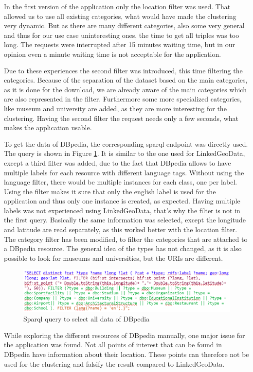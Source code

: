 In the first version of the application only the location filter was used. That allowed us to use all existing categories, what would have made the clustering very dynamic. But as there are many different categories, also some very general and thus for our use case uninteresting ones, the time to get all triples was too long. The requests were interrupted after 15 minutes waiting time, but in our opinion even a minute waiting time is not acceptable for the application. 

Due to these experiences the second filter was introduced, this time filtering the categories. Because of the separation of the dataset based on the main categories, as it is done for the download, we are already aware of the main categories which are also represented in the filter. Furthermore some more specialized categories, like museum and university are added, as they are more interesting for the clustering. Having the second filter the request needs only a few seconds, what makes the application usable.

To get the data of DBpedia, the corresponding sparql endpoint was directly used. The query is shown in Figure \ref{fig:sparqlDbpedia}. It is similar to the one used for LinkedGeoData, except a third filter was added, due to the fact that DBpedia allows to have multiple labels for each resource with different language tags. Without using the language filter, there would be multiple instances for each class, one per label. Using the filter makes it sure that only the english label is used for the application and thus only one instance is created, as expected. Having multiple labels was not experienced using LinkedGeoData, that’s why the filter is not in the first query. Basically the same information was selected, except the longitude and latitude are read separately, as this worked better with the location filter. The category filter has been modified, to filter the categories that are attached to a DBpedia resource. The general idea of the types has not changed, as it is also possible to look for museums and universities, but the URIs are different. 

\begin{figure}
	\centering
	\includegraphics[scale=0.7]{./content/sparqlDbpedia.png}
	\caption{Sparql query to select all data of DBpedia}\label{fig:sparqlDbpedia}
\end{figure}

While exploring the different resources of DBpedia manually, one major issue for the application was found. Not all points of interest that can be found in DBpedia have information about their location. These points can therefore not be used for the clustering and falsify the result compared to LinkedGeoData.